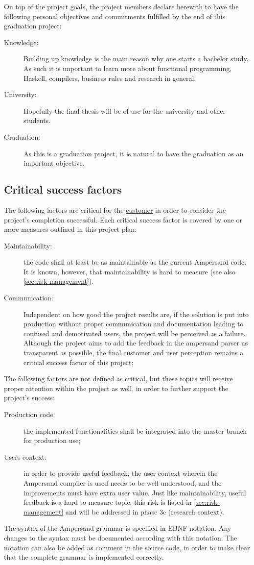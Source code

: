 On top of the project goals, the project members declare herewith to have the following personal objectives and commitments fulfilled by the end of this graduation project:
\begin{description}
	\item[Knowledge:] Building up knowledge is the main reason why one starts a bachelor study.
		As such it is important to learn more about functional programming, Haskell, compilers, business rules and research in general.
	\item[University:] Hopefully the final thesis will be of use for the university and other students.
	\item[Graduation:] As this is a graduation project, it is natural to have the graduation as an important objective.
\end{description}

\subsection{Critical success factors}
\label{subsec:success-factors}
The following factors are critical for the \underline{customer} in order to consider the project's completion successful.
Each critical success factor is covered by one or more measures outlined in this project plan:
\begin{description}
	\item[Maintainability:] the code shall at least be as maintainable as the current Ampersand code.
		It is known, however, that maintainability is hard to measure (see also \autoref{sec:risk-management}).
	\item[Communication:] Independent on how good the project results are, if the solution is put into production without proper communication and documentation leading to confused and demotivated users, the project will be perceived as a failure. 
	Although the project aims to add the feedback in the ampersand parser as transparent as possible, the final customer and user perception remains a critical success factor of this project;
\end{description}
%
The following factors are not defined as critical, but these topics will receive proper attention within the project as well, in order to further support the project's success:
\begin{description}
	\item[Production code:] the implemented functionalities shall be integrated into the master branch for production use;
	\item[Users context:] in order to provide useful feedback, the user context wherein the Ampersand compiler is used needs to be well understood, and the improvements must have extra user value. 
		Just like maintainability, useful feedback is a hard to measure topic, this risk is listed in \autoref{sec:risk-management} and will be addressed in phase 3c (research context).
\end{description}
%
The syntax of the Ampersand grammar is specified in EBNF notation.
Any changes to the syntax must be documented according with this notation.
The notation can also be added as comment in the source code, in order to make clear that the complete grammar is implemented correctly.

